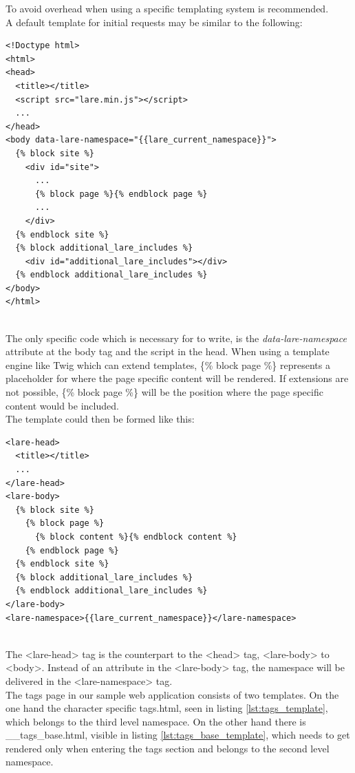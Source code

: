 To avoid overhead when using \lare{} a specific templating system is recommended.
\\
A default template for initial requests may be similar to the following:

\begin{minipage}[c]{0.95\linewidth}
\begin{lstlisting}[caption=\_\_base.html, label=lst:example_lare_base_template]
<!Doctype html>
<html>
<head>
  <title></title>
  <script src="lare.min.js"></script>
  ...
</head>
<body data-lare-namespace="{{lare_current_namespace}}">
  {% block site %}
    <div id="site">
      ...
      {% block page %}{% endblock page %}
      ...
    </div>
  {% endblock site %}
  {% block additional_lare_includes %}
    <div id="additional_lare_includes"></div>
  {% endblock additional_lare_includes %}
</body>
</html>
\end{lstlisting}
\end{minipage}
\\
The only specific code which is necessary for \lare{} to write, is the \emph{data-lare-namespace} attribute at the body tag and the script in the head.
When using a template engine like Twig which can extend templates, \{\% block page \%\} represents a placeholder for where the page specific content will be rendered.
If extensions are not possible, \{\% block page \%\} will be the position where the page specific content would be included.
\\
The \lare{} template could then be formed like this:

\begin{minipage}[c]{0.95\linewidth}
\begin{lstlisting}[caption=\_\_lare.html, label=lst:example_lare_template]
<lare-head>
  <title></title>
  ...
</lare-head>
<lare-body>
  {% block site %}
    {% block page %}
      {% block content %}{% endblock content %}
    {% endblock page %}
  {% endblock site %}
  {% block additional_lare_includes %}
  {% endblock additional_lare_includes %}
</lare-body>
<lare-namespace>{{lare_current_namespace}}</lare-namespace>
\end{lstlisting}
\end{minipage}
\\
The <lare-head> tag is the counterpart to the <head> tag, <lare-body> to <body>.
Instead of an attribute in the <lare-body> tag, the namespace will be delivered in the <lare-namespace> tag.
\\
The tags page in our sample web application consists of two templates.
On the one hand the character specific tags.html, seen in listing \ref{lst:tags_template}, which belongs to the third level namespace.
On the other hand there is \_\_tags\_base.html, visible in listing \ref{lst:tags_base_template}, which needs to get rendered only when entering the tags section and belongs to the second level namespace.


